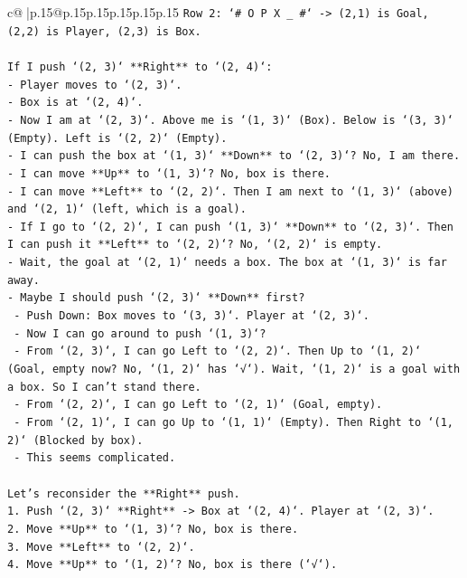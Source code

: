 \documentclass{article}
\begin{document}
{\begin{supertabular}{c@{$\;$}|p{.15\linewidth}@{}p{.15\linewidth}p{.15\linewidth}p{.15\linewidth}p{.15\linewidth}p{.15\linewidth}}
{{{\texttt{Row 2: `\# O P X \_ \#` {-}> (2,1) is Goal, (2,2) is Player, (2,3) is Box.} \\
\\ 
\texttt{If I push `(2, 3)` **Right** to `(2, 4)`:} \\
\texttt{{-} Player moves to `(2, 3)`.} \\
\texttt{{-} Box is at `(2, 4)`.} \\
\texttt{{-} Now I am at `(2, 3)`. Above me is `(1, 3)` (Box). Below is `(3, 3)` (Empty). Left is `(2, 2)` (Empty).} \\
\texttt{{-} I can push the box at `(1, 3)` **Down** to `(2, 3)`? No, I am there.} \\
\texttt{{-} I can move **Up** to `(1, 3)`? No, box is there.} \\
\texttt{{-} I can move **Left** to `(2, 2)`. Then I am next to `(1, 3)` (above) and `(2, 1)` (left, which is a goal).} \\
\texttt{{-} If I go to `(2, 2)`, I can push `(1, 3)` **Down** to `(2, 3)`. Then I can push it **Left** to `(2, 2)`? No, `(2, 2)` is empty.} \\
\texttt{{-} Wait, the goal at `(2, 1)` needs a box. The box at `(1, 3)` is far away.} \\
\texttt{{-} Maybe I should push `(2, 3)` **Down** first?} \\
\texttt{  {-} Push Down: Box moves to `(3, 3)`. Player at `(2, 3)`.} \\
\texttt{  {-} Now I can go around to push `(1, 3)`?} \\
\texttt{  {-} From `(2, 3)`, I can go Left to `(2, 2)`. Then Up to `(1, 2)` (Goal, empty now? No, `(1, 2)` has `√`). Wait, `(1, 2)` is a goal with a box. So I can't stand there.} \\
\texttt{  {-} From `(2, 2)`, I can go Left to `(2, 1)` (Goal, empty).} \\
\texttt{  {-} From `(2, 1)`, I can go Up to `(1, 1)` (Empty). Then Right to `(1, 2)` (Blocked by box).} \\
\texttt{  {-} This seems complicated.} \\
\\ 
\texttt{Let's reconsider the **Right** push.} \\
\texttt{1. Push `(2, 3)` **Right** {-}> Box at `(2, 4)`. Player at `(2, 3)`.} \\
\texttt{2. Move **Up** to `(1, 3)`? No, box is there.} \\
\texttt{3. Move **Left** to `(2, 2)`.} \\
\texttt{4. Move **Up** to `(1, 2)`? No, box is there (`√`).} \\
}}}
\end{supertabular}}
\end{document}
